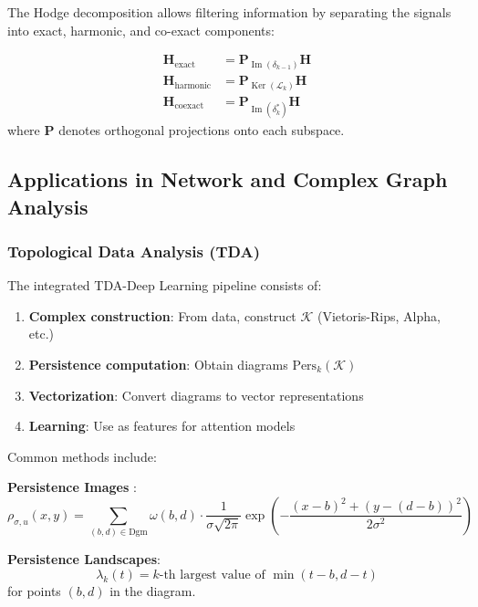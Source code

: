 The Hodge decomposition allows filtering information by separating the signals into exact, harmonic, and co-exact components:

\begin{align}
\mathbf{H}_{\text{exact}} &= \mathbf{P}_{\operatorname{Im}(\delta_{k-1})} \mathbf{H} \label{eq:exact_component} \\
\mathbf{H}_{\text{harmonic}} &= \mathbf{P}_{\operatorname{Ker}(\mathcal{L}_k)} \mathbf{H} \\
\mathbf{H}_{\text{coexact}} &= \mathbf{P}_{\operatorname{Im}(\delta_k^*)} \mathbf{H}
\end{align}
where $\mathbf{P}$ denotes orthogonal projections onto each subspace.

\subsection{Applications in Network and Complex Graph Analysis}

\subsubsection{Topological Data Analysis (TDA)}

\begin{definition}\label{def:pipeline_tda_dl}
The integrated TDA-Deep Learning pipeline consists of:
\begin{enumerate}
    \item \textbf{Complex construction}: From data, construct $\mathcal{K}$ (Vietoris-Rips, Alpha, etc.)
    \item \textbf{Persistence computation}: Obtain diagrams $\text{Pers}_k(\mathcal{K})$
    \item \textbf{Vectorization}: Convert diagrams to vector representations
    \item \textbf{Learning}: Use as features for attention models
\end{enumerate}
\end{definition}

\begin{definition}\label{def:representaciones_persistencia}
Common methods include:

\textbf{Persistence Images} \citep{adams2017persistence}:
\begin{equation}
    \rho_{\sigma,u}(x,y) = \sum_{(b,d) \in \text{Dgm}} \omega(b,d) \cdot \frac{1}{\sigma\sqrt{2\pi}} \exp\left(-\frac{(x-b)^2 + (y-(d-b))^2}{2\sigma^2}\right)
\end{equation}

\textbf{Persistence Landscapes}:
\begin{equation}
    \lambda_k(t) = k\text{-th largest value of } \min(t-b, d-t)
\end{equation}
for points $(b,d)$ in the diagram.
\end{definition}

